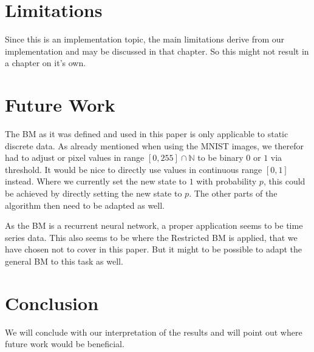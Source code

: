 \documentclass[12pt,twoside]{article}
\theoremstyle{plain}
\theoremstyle{definition}
\theoremstyle{remark}
\begin{document}
\section{Limitations}
\label{sec:limits}

Since this is an implementation topic, the main limitations derive from our implementation and may be discussed in that chapter. So this might not result in a chapter on it's own. %


\section{Future Work}
\label{sec:future}


The BM as it was defined and used in this paper is only applicable to static discrete data. As already mentioned when using the MNIST images, we therefor had to adjust or pixel values in range $[0,255]\cap\mathbb{N}$ to be binary $0$ or $1$ via threshold. It would be nice to directly use values in continuous range $[0,1]$ instead. Where we currently set the new state to $1$ with probability $p$, this could be achieved by directly setting the new state to $p$. The other parts of the algorithm then need to be adapted as well.

As the BM is a recurrent neural network, a proper application seems to be time series data. This also seems to be where the Restricted BM is applied, that we have chosen not to cover in this paper. But it might to be possible to adapt the general BM to this task as well.


\section{Conclusion}
\label{sec:concl}

We will conclude with our interpretation of the results and will point out where future work would be beneficial.


%
%
\newpage


\end{document}
